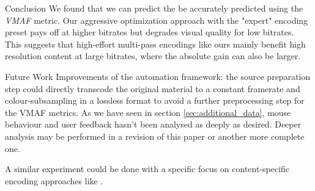 \large{Conclusion}
We found that we can predict the be accurately predicted using the \textit{VMAF} metric.
Our aggressive optimization approach with the "expert" encoding preset pays off at higher bitrates but degrades visual quality for low bitrates. This suggests that high-effort multi-pass encodings like ours mainly benefit high resolution content at large bitrates, where the absolute gain can also be larger.


\large{Future Work}
Improvements of the automation framework: the source preparation step could directly transcode the original material to a constant framerate and colour-subsampling in a lossless format to avoid a further preprocessing step for the VMAF metrics.
As we have seen in section \ref{sec:additional_data}, mouse behaviour and user feedback hasn't been analysed as deeply as desired. 
Deeper analysis may be performed in a revision of this paper or another more complete one.


A similar experiment could be done with a specific focus on content-specific encoding approaches like \cite{cock:2016:titleencode}.

